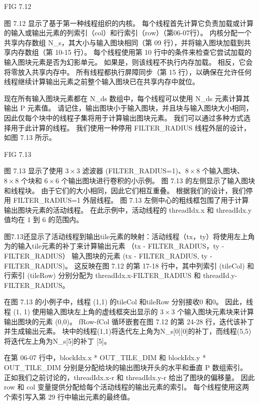 {\color{red} FIG 7.12}

图 7.12 显示了基于第一种线程组织的内核。 
每个线程首先计算它负责加载或计算的输入或输出元素的列索引（col）和行索引（row）（第06-07行）。 
内核分配一个共享内存数组 N\_s，其大小与输入图块相同（第 09 行），并将输入图块加载到共享内存数组（第 10-15 行）。 
每个线程使用第 10 行中的条件来检查它尝试加载的输入图块元素是否为幻影单元。 
如果是，则该线程不执行内存加载。 相反，它会将零放入共享内存中。 
所有线程都执行屏障同步（第 15 行），以确保在允许任何线程继续计算输出元素之前整个输入图块已在共享内存中就位。

现在所有输入图块元素都在 N\_ds 数组中，每个线程可以使用 N\_ds 元素计算其输出 P 元素值。 
请记住，输出图块小于输入图块，并且块与输入图块大小相同，因此仅每个块中的线程子集将用于计算输出图块元素。 
我们可以通过多种方式选择用于此计算的线程。 我们使用一种停用 FILTER\_RADIUS 线程外层的设计，如图 7.13 所示。

{\color{red} FIG 7.13}

图 7.13 显示了使用 $3 \times 3$ 滤波器 (FILTER\_RADIUS=1)、$8 \times 8$ 个输入图块、
$8 \times 8$ 个块和 $6 \times 6$ 个输出图块进行卷积的小示例。 
图 7.13 的左侧显示了输入图块和线程块。 由于它们的大小相同，因此它们相互重叠。 
根据我们的设计，我们停用 FILTER\_RADIUS=1 外层线程。 
图 7.13 左侧中心的粗线框包围了用于计算输出图块元素的活动线程。 
在此示例中，活动线程的 threadIdx.x 和 threadIdx.y 值均在 1 到 6 的范围内。

图7.13还显示了活动线程到输出tile元素的映射：活动线程（tx，ty）将使用左上角为的输入tile元素的补丁来计算输出元素
（tx - FILTER\_RADIUS，ty - FILTER\_RADIUS） 输入图块的元素 (tx - FILTER\_RADIUS, ty - FILTER\_RADIUS)。 
这反映在图 7.12 的第 17-18 行中，其中列索引 (tileCol) 和行索引 (tileRow) 
分别分配为 threadIdx.x-FILTER\_RADIUS 和 threadId.y-FILTER\_RADIUS。

在图 7.13 的小例子中，线程 (1,1) 的tileCol 和tileRow 分别接收0 和0。 
因此，线程 (1, 1) 使用输入图块左上角的虚线框突出显示的 $3 \times 3$ 个输入图块元素块来计算输出图块的元素 (0,0)。 
fRow-fCol 循环嵌套在图 7.12 的第 24-28 行，迭代该补丁并生成输出元素。 
块中的线程(1,1)将迭代左上角为N\_s[0][0]的补丁，而线程(5,5)将迭代左上角为N\_s[5]的补丁 [5]。

在第 06-07 行中，blockIdx.x * OUT\_TILE\_DIM 和 blockIdx.y * OUT\_TILE\_DIM 
分别是分配给块的输出图块开头的水平和垂直 P 数组索引。 
正如我们之前讨论的，threadIdx.x-r 和 threadIdx.y-r 给出了图块的偏移量。 
因此 row 和 col 变量提供分配给每个活动线程的输出元素的索引。 每个线程使用这两个索引写入第 29 行中输出元素的最终值。


